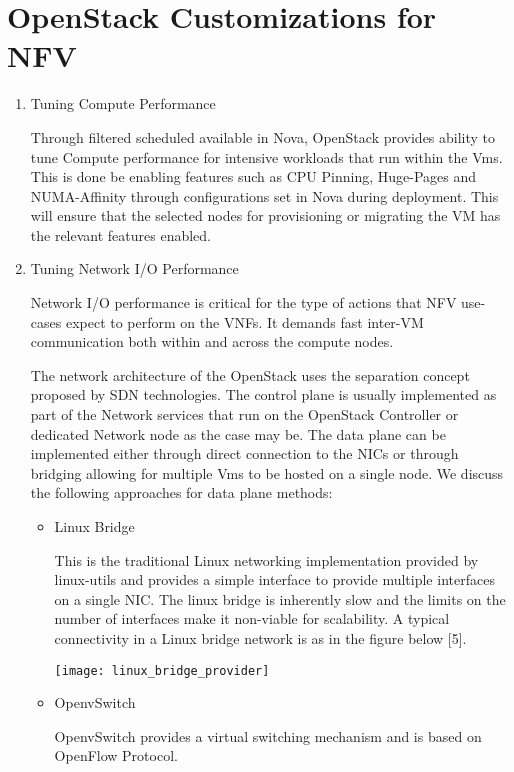 \section{OpenStack Customizations for NFV}

\begin{enumerate}
\item Tuning Compute Performance
\begin{flushleft}
Through filtered scheduled available in Nova, OpenStack provides ability to tune Compute performance for intensive workloads that run within the Vms. This is done be enabling features such as CPU Pinning, Huge-Pages and NUMA-Affinity through configurations set in Nova during deployment. This will ensure that the selected nodes for provisioning or migrating the VM has the relevant features enabled. 
\end{flushleft}

\item Tuning Network I/O Performance
\begin{flushleft}
Network I/O performance is critical for the type of actions that NFV use-cases expect to perform on the VNFs. It demands fast inter-VM communication both within and across the compute nodes. 

The network architecture of the OpenStack uses the separation concept proposed by SDN technologies. The control plane is usually implemented as part of the Network services that run on the OpenStack Controller or dedicated Network node as the case may be. The data plane can be implemented either through direct connection to the NICs or through bridging allowing for multiple Vms to be hosted on a single node. We discuss the following approaches for data plane methods:
		
\begin{itemize}
\item Linux Bridge
\begin{flushleft}
This is the traditional Linux networking implementation provided by linux-utils and provides a simple interface to provide multiple interfaces on a single NIC. The linux bridge is inherently slow and the limits on the number of interfaces make it non-viable for scalability. A typical connectivity in a Linux bridge network is as in the figure below [5].
				
\texttt{[image: linux\_bridge\_provider]}
				
\end{flushleft}
\item OpenvSwitch
\begin{flushleft}
OpenvSwitch provides a virtual switching mechanism and is based on OpenFlow Protocol. 
				

\end{flushleft}
\end{itemize}
\end{flushleft}
\end{enumerate}
